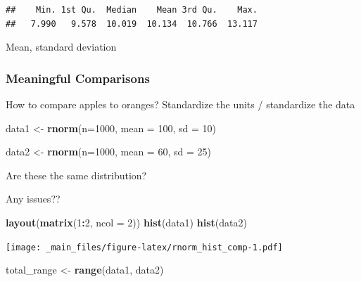 \documentclass[
]{book}
\newenvironment{Shaded}{\begin{snugshade}}{\end{snugshade}}
\newcommand{\AttributeTok}[1]{\textcolor[rgb]{0.13,0.29,0.53}{#1}}
\newcommand{\DecValTok}[1]{\textcolor[rgb]{0.00,0.00,0.81}{#1}}
\newcommand{\FunctionTok}[1]{\textcolor[rgb]{0.13,0.29,0.53}{\textbf{#1}}}
\newcommand{\NormalTok}[1]{#1}
\newcommand{\OtherTok}[1]{\textcolor[rgb]{0.56,0.35,0.01}{#1}}
\newcommand{\SpecialCharTok}[1]{\textcolor[rgb]{0.81,0.36,0.00}{\textbf{#1}}}
\begin{document}
\begin{verbatim}
##    Min. 1st Qu.  Median    Mean 3rd Qu.    Max. 
##   7.990   9.578  10.019  10.134  10.766  13.117
\end{verbatim}

Mean, standard deviation

\hypertarget{meaningful-comparisons}{%
\subsubsection{Meaningful Comparisons}\label{meaningful-comparisons}}

How to compare apples to oranges? Standardize the units / standardize the data

\begin{Shaded}
\begin{Highlighting}[]
\NormalTok{data1 }\OtherTok{\textless{}{-}} \FunctionTok{rnorm}\NormalTok{(}\AttributeTok{n=}\DecValTok{1000}\NormalTok{, }
              \AttributeTok{mean =} \DecValTok{100}\NormalTok{,}
              \AttributeTok{sd =} \DecValTok{10}\NormalTok{)}

\NormalTok{data2 }\OtherTok{\textless{}{-}} \FunctionTok{rnorm}\NormalTok{(}\AttributeTok{n=}\DecValTok{1000}\NormalTok{,}
               \AttributeTok{mean =} \DecValTok{60}\NormalTok{, }
               \AttributeTok{sd =} \DecValTok{25}\NormalTok{)}
\end{Highlighting}
\end{Shaded}

Are these the same distribution?

Any issues??

\begin{Shaded}
\begin{Highlighting}[]
\FunctionTok{layout}\NormalTok{(}\FunctionTok{matrix}\NormalTok{(}\DecValTok{1}\SpecialCharTok{:}\DecValTok{2}\NormalTok{, }\AttributeTok{ncol =} \DecValTok{2}\NormalTok{))}
\FunctionTok{hist}\NormalTok{(data1)}
\FunctionTok{hist}\NormalTok{(data2)}
\end{Highlighting}
\end{Shaded}

\texttt{[image: \_main\_files/figure-latex/rnorm\_hist\_comp-1.pdf]}

\begin{Shaded}
\begin{Highlighting}[]
\NormalTok{total\_range }\OtherTok{\textless{}{-}} \FunctionTok{range}\NormalTok{(data1, data2)}
\end{Highlighting}
\end{Shaded}
\end{document}
